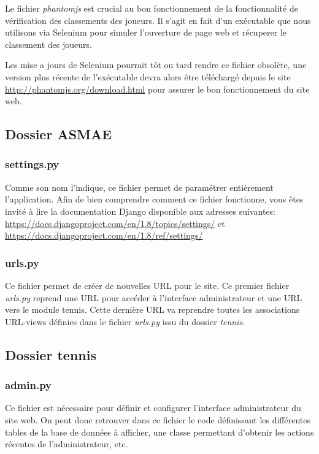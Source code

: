 Le fichier \textit{phantomjs} est crucial au bon fonctionnement de la fonctionnalité de vérification des classements des joueurs. Il s'agit en fait d'un exécutable que nous utilisons via Selenium pour simuler l'ouverture de page web et
récuperer le classement des joueurs. \newline

Les mise a jours de Selenium pourrait tôt ou tard
rendre ce fichier obsolète, une version plus récente de l'exécutable devra alors être 
téléchargé depuis le site \url{http://phantomjs.org/download.html} pour assurer le bon
fonctionnement du site web.

\subsection{Dossier ASMAE}

\subsubsection{settings.py}

Comme son nom l'indique, ce fichier permet de paramétrer entièrement l'application. Afin de bien comprendre comment ce fichier fonctionne, vous êtes invité à lire la documentation Django disponible aux adresses suivantes: \url{https://docs.djangoproject.com/en/1.8/topics/settings/} et \url{https://docs.djangoproject.com/en/1.8/ref/settings/}

\subsubsection{urls.py}

Ce fichier permet de créer de nouvelles URL pour le site. Ce premier fichier \textit{urls.py} reprend une URL pour accéder à l'interface administrateur et une URL vers le module tennis. Cette dernière URL va reprendre toutes les associations URL-views définies dans le fichier \textit{urls.py} issu du dossier \textit{tennis}.

\subsection{Dossier tennis}

\subsubsection{admin.py}

Ce fichier est nécessaire pour définir et configurer l'interface administrateur du site web. On peut donc retrouver dans ce fichier le code définissant les différentes tables de la base de données à afficher, une classe permettant d'obtenir les actions récentes de l'administrateur, etc.

